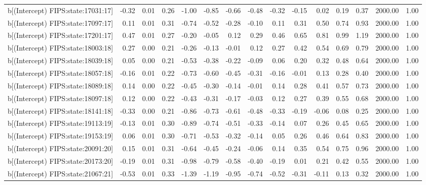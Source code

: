 \begin{table}[ht]
\begin{tabular}{rrrrrrrrrrrrrrr}
  b[(Intercept) FIPS:state:17031:17] & -0.32 & 0.01 & 0.26 & -1.00 & -0.85 & -0.66 & -0.48 & -0.32 & -0.15 & 0.02 & 0.19 & 0.37 & 2000.00 & 1.00 \\ 
  b[(Intercept) FIPS:state:17097:17] & 0.11 & 0.01 & 0.31 & -0.74 & -0.52 & -0.28 & -0.10 & 0.11 & 0.31 & 0.50 & 0.74 & 0.93 & 2000.00 & 1.00 \\ 
  b[(Intercept) FIPS:state:17201:17] & 0.47 & 0.01 & 0.27 & -0.20 & -0.05 & 0.12 & 0.29 & 0.46 & 0.65 & 0.81 & 0.99 & 1.19 & 2000.00 & 1.00 \\ 
  b[(Intercept) FIPS:state:18003:18] & 0.27 & 0.00 & 0.21 & -0.26 & -0.13 & -0.01 & 0.12 & 0.27 & 0.42 & 0.54 & 0.69 & 0.79 & 2000.00 & 1.00 \\ 
  b[(Intercept) FIPS:state:18039:18] & 0.05 & 0.00 & 0.21 & -0.53 & -0.38 & -0.22 & -0.09 & 0.06 & 0.20 & 0.32 & 0.48 & 0.64 & 2000.00 & 1.00 \\ 
  b[(Intercept) FIPS:state:18057:18] & -0.16 & 0.01 & 0.22 & -0.73 & -0.60 & -0.45 & -0.31 & -0.16 & -0.01 & 0.13 & 0.28 & 0.40 & 2000.00 & 1.00 \\ 
  b[(Intercept) FIPS:state:18089:18] & 0.14 & 0.00 & 0.22 & -0.45 & -0.30 & -0.14 & -0.01 & 0.14 & 0.28 & 0.41 & 0.57 & 0.73 & 2000.00 & 1.00 \\ 
  b[(Intercept) FIPS:state:18097:18] & 0.12 & 0.00 & 0.22 & -0.43 & -0.31 & -0.17 & -0.03 & 0.12 & 0.27 & 0.39 & 0.55 & 0.68 & 2000.00 & 1.00 \\ 
  b[(Intercept) FIPS:state:18141:18] & -0.33 & 0.00 & 0.21 & -0.86 & -0.73 & -0.61 & -0.48 & -0.33 & -0.19 & -0.06 & 0.08 & 0.25 & 2000.00 & 1.00 \\ 
  b[(Intercept) FIPS:state:19113:19] & -0.13 & 0.01 & 0.30 & -0.89 & -0.74 & -0.51 & -0.33 & -0.14 & 0.07 & 0.26 & 0.45 & 0.65 & 2000.00 & 1.00 \\ 
  b[(Intercept) FIPS:state:19153:19] & 0.06 & 0.01 & 0.30 & -0.71 & -0.53 & -0.32 & -0.14 & 0.05 & 0.26 & 0.46 & 0.64 & 0.83 & 2000.00 & 1.00 \\ 
  b[(Intercept) FIPS:state:20091:20] & 0.15 & 0.01 & 0.31 & -0.64 & -0.45 & -0.24 & -0.06 & 0.14 & 0.35 & 0.54 & 0.75 & 0.96 & 2000.00 & 1.00 \\ 
  b[(Intercept) FIPS:state:20173:20] & -0.19 & 0.01 & 0.31 & -0.98 & -0.79 & -0.58 & -0.40 & -0.19 & 0.01 & 0.21 & 0.42 & 0.55 & 2000.00 & 1.00 \\ 
  b[(Intercept) FIPS:state:21067:21] & -0.53 & 0.01 & 0.33 & -1.39 & -1.19 & -0.95 & -0.74 & -0.52 & -0.31 & -0.11 & 0.13 & 0.32 & 2000.00 & 1.00 \\ 

\end{tabular}
\end{table}
